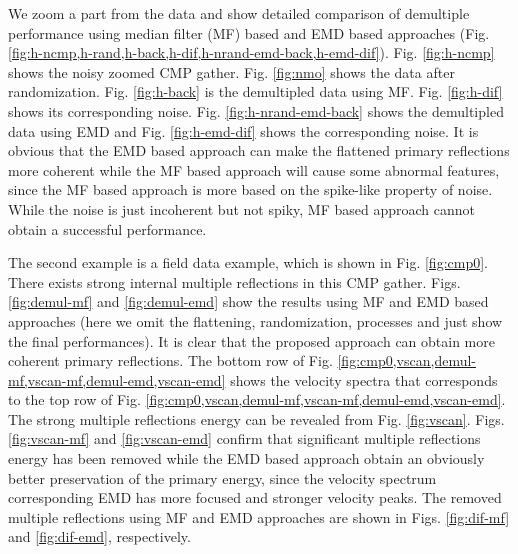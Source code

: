 We zoom a part from the data and show detailed comparison of demultiple performance using median filter (MF) based and EMD based approaches (Fig. \ref{fig:h-ncmp,h-rand,h-back,h-dif,h-nrand-emd-back,h-emd-dif}). Fig. \ref{fig:h-ncmp} shows the noisy zoomed CMP gather. Fig. \ref{fig:nmo} shows the data after randomization.  Fig. \ref{fig:h-back} is the demultipled data using MF. Fig. \ref{fig:h-dif} shows its corresponding noise. Fig. \ref{fig:h-nrand-emd-back} shows the demultipled data using EMD and Fig. \ref{fig:h-emd-dif} shows the corresponding noise. It is obvious that the EMD based approach can make the flattened primary reflections more coherent while the MF based approach will cause some abnormal features, since the MF based approach is more based on the spike-like property of noise. While the noise is just incoherent but not spiky, MF based approach cannot obtain a successful performance. 

The second example is a field data example, which is shown in Fig. \ref{fig:cmp0}.
There exists strong internal multiple reflections in this CMP gather. Figs. \ref{fig:demul-mf} and \ref{fig:demul-emd} show the results using MF and EMD based approaches (here we omit the flattening, randomization, processes and just show the final performances). It is clear that the proposed approach can obtain more coherent primary reflections. The bottom row of Fig. \ref{fig:cmp0,vscan,demul-mf,vscan-mf,demul-emd,vscan-emd} shows the velocity spectra that corresponds to the top row of Fig. \ref{fig:cmp0,vscan,demul-mf,vscan-mf,demul-emd,vscan-emd}. The strong multiple reflections energy can be revealed from Fig. \ref{fig:vscan}. Figs. \ref{fig:vscan-mf} and \ref{fig:vscan-emd} confirm that significant multiple reflections energy has been removed while the EMD based approach obtain an obviously better preservation of the primary energy, since the velocity spectrum corresponding EMD has more focused and stronger velocity peaks. The removed multiple reflections using MF and EMD approaches are shown in Figs. \ref{fig:dif-mf} and \ref{fig:dif-emd}, respectively. 

